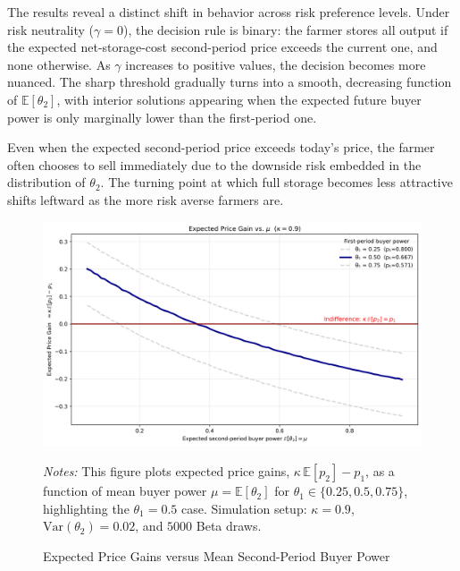 The results reveal a distinct shift in behavior across risk preference levels. Under risk neutrality ($\gamma = 0$), the decision rule is binary: the farmer stores all output if the expected net-storage-cost second-period price exceeds the current one, and none otherwise. As $\gamma$ increases to positive values, the decision becomes more nuanced. The sharp threshold gradually turns into a smooth, decreasing function of $\mathbb{E}[\theta_2]$, with interior solutions appearing when the expected future buyer power is only marginally lower than the first-period one.

Even when the expected second-period price exceeds today's price, the farmer often chooses to sell immediately due to the downside risk embedded in the distribution of $\theta_2$. The turning point at which full storage becomes less attractive shifts leftward as the more risk averse farmers are.

\begin{figure}[ht!]
\centering
\includegraphics[width=\textwidth]{model_figures/expected_price_gain_vs_mu.png}
\caption{Expected Price Gains versus Mean Second-Period Buyer Power}
\label{Figure: expected price gain vs mu}
\begin{tablenotes}[flushleft]
\footnotesize
\item \textit{Notes:} This figure plots expected price gains, $\kappa\,\mathbb{E}[p_2]-p_1$, as a function of mean buyer power $\mu = \mathbb{E}[\theta_2]$ for $\theta_1 \in \{0.25, 0.5, 0.75\}$, highlighting the $\theta_1=0.5$ case. 
Simulation setup: $\kappa=0.9$, $\mathrm{Var}(\theta_2)=0.02$, and $5000$ Beta draws.
\end{tablenotes}
\end{figure}



